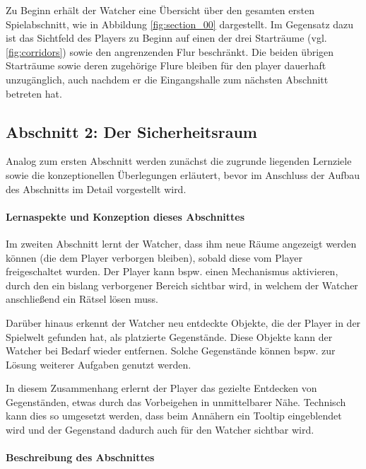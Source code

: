 Zu Beginn erhält der Watcher eine Übersicht über den gesamten ersten Spielabschnitt, wie in Abbildung  \ref{fig:section_00} dargestellt. Im Gegensatz dazu ist das Sichtfeld des Players zu Beginn auf einen der drei Starträume (vgl. \ref{fig:corridors}) sowie den angrenzenden Flur beschränkt. Die beiden übrigen Starträume sowie deren zugehörige Flure bleiben für den player dauerhaft unzugänglich, auch nachdem er die Eingangshalle zum nächsten Abschnitt betreten hat.

\subsection{Abschnitt 2: Der Sicherheitsraum}

Analog zum ersten Abschnitt werden zunächst die zugrunde liegenden Lernziele sowie die konzeptionellen Überlegungen erläutert, bevor im Anschluss der Aufbau des Abschnitts im Detail vorgestellt wird.

\paragraph{Lernaspekte und Konzeption dieses Abschnittes}

Im zweiten Abschnitt lernt der Watcher, dass ihm neue Räume angezeigt werden können (die dem Player verborgen bleiben), sobald diese vom Player freigeschaltet wurden. Der Player kann bspw. einen Mechanismus aktivieren, durch den ein bislang verborgener Bereich sichtbar wird, in welchem der Watcher anschließend ein Rätsel lösen muss.

Darüber hinaus erkennt der Watcher neu entdeckte Objekte, die der Player in der Spielwelt gefunden hat, als platzierte Gegenstände. Diese Objekte kann der Watcher bei Bedarf wieder entfernen. Solche Gegenstände können bspw. zur Lösung weiterer Aufgaben genutzt werden.

In diesem Zusammenhang erlernt der Player das gezielte Entdecken von Gegenständen, etwas durch das Vorbeigehen in unmittelbarer Nähe. Technisch kann dies so umgesetzt werden, dass beim Annähern ein Tooltip eingeblendet wird und der Gegenstand dadurch auch für den Watcher sichtbar wird.

\paragraph{Beschreibung des Abschnittes}

